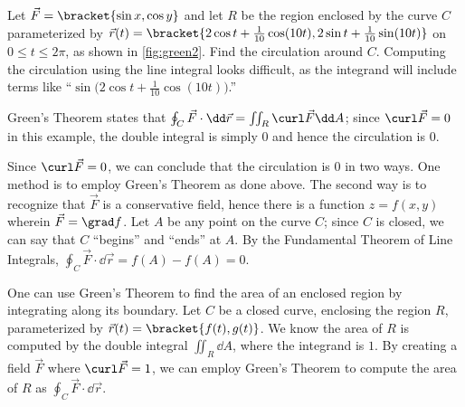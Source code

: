 \begin{example}\label{ex_green2}
%
%
Let $\vec F =\bracket{\sin x,\cos y}$ and let $R$ be the region enclosed by the curve $C$ parameterized by $\vec r(t) =\bracket{2\cos t+ \frac1{10}\cos(10t),2\sin t+\frac1{10}\sin(10t)}$ on $0\leq t\leq 2\pi$, as shown in \autoref{fig:green2}. Find the circulation around $C$.
\solution
Computing the circulation using the line integral looks difficult, as the integrand will include terms like ``$\sin\bigl(2\cos t + \frac1{10}\cos(10t)\bigr)$.'' 

Green's Theorem states that $\oint_C\vec F\cdot\dd\vec r = \iint_R \curl\vec F\dd A$; since $\curl \vec F = 0$ in this example, the double integral is simply 0 and hence the circulation is 0.

Since $\curl \vec F = 0$, we can conclude that the circulation is 0 in two ways. One method is to employ Green's Theorem as done above. The second way is to recognize that $\vec F$ is a conservative field, hence there is a function $z=f(x,y)$ wherein $\vec F = \grad f$. Let $A$ be any point on the curve $C$; since $C$ is closed, we can say that $C$ ``begins'' and ``ends'' at $A$. By the Fundamental Theorem of Line Integrals, $\oint_C \vec F\cdot\dd\vec r = f(A)-f(A) = 0$.
\end{example}

One can use Green's Theorem to find the area of an enclosed region by integrating along its boundary. Let $C$ be a closed curve, enclosing the region $R$, parameterized by $\vec r(t) =\bracket{f(t),g(t)}$. We know the area of $R$ is computed by the double integral $\iint_R \dd A$, where the integrand is $1$. By creating a field $\vec F$ where $\curl \vec F =1$, we can employ Green's Theorem to compute the area of $R$ as $\oint_C \vec F\cdot\dd\vec r$. 

